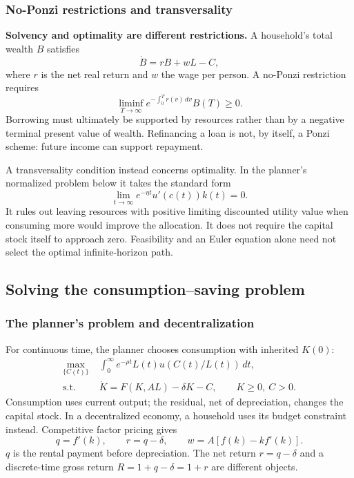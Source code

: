 \subsubsection{No-Ponzi restrictions and transversality}

\begin{blueblock}
\textbf{Solvency and optimality are different restrictions.}
A household's total wealth $B$ satisfies
\begin{equation}
\dot B=rB+wL-C,
\end{equation}
where $r$ is the net real return and $w$ the wage per person. A no-Ponzi
restriction requires
\begin{equation}\label{eq:ramsey-npg}
\liminf_{T\to\infty}e^{-\int_0^T r(v)\,dv}B(T)\geq0.
\end{equation}
Borrowing must ultimately be supported by resources rather than by a negative
terminal present value of wealth. Refinancing a loan is not, by itself, a
Ponzi scheme: future income can support repayment.

A transversality condition instead concerns optimality. In the planner's
normalized problem below it takes the standard form
\begin{equation}\label{eq:ramsey-tvc}
\lim_{t\to\infty}e^{-\eta t}u'(c(t))k(t)=0.
\end{equation}
It rules out leaving resources with positive limiting discounted utility value
when consuming more would improve the allocation. It does not require the
capital stock itself to approach zero. Feasibility and an Euler equation alone
need not select the optimal infinite-horizon path.
\end{blueblock}

\subsection{Solving the consumption--saving problem}

\subsubsection{The planner's problem and decentralization}\label{central-planners-problem}

For continuous time, the planner chooses consumption with inherited $K(0)$:
\begin{equation}\label{eq:ramsey-planner}
\begin{split}
\max_{\{C(t)\}}\;&\int_0^\infty e^{-\rho t}L(t)u(C(t)/L(t))\,dt,\\
\text{s.t. }&\dot K=F(K,AL)-\delta K-C,\qquad K\geq0,\ C>0.
\end{split}
\end{equation}
Consumption uses current output; the residual, net of depreciation, changes
the capital stock. In a decentralized economy, a household uses its budget
constraint instead. Competitive factor pricing gives
\begin{equation}\label{eq:ramsey-factor-prices}
q=f'(k),\qquad r=q-\delta,\qquad
w=A\left[f(k)-kf'(k)\right].
\end{equation}
$q$ is the rental payment before depreciation. The net return $r=q-\delta$
and a discrete-time gross return $R=1+q-\delta=1+r$ are different objects.

